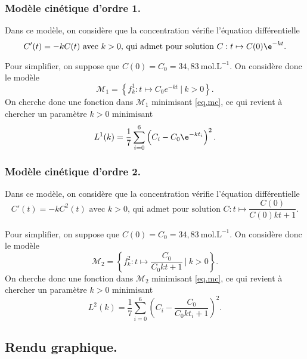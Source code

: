 \subsubsection*{Modèle cinétique d'ordre 1.}

Dans ce modèle, on considère que la concentration vérifie l'équation différentielle 
\begin{equation*}
   C'(t) = -k C(t) \textrm{ avec }k>0 \textrm{, qui admet pour solution } C:t\mapsto C(0) \e^{-kt}.
\end{equation*}

Pour simplifier, on suppose que $C(0) = C_0 = 34,83~\textrm{mol}.\textrm{L}^{-1}$. On considère donc le modèle
\begin{equation*}
  \mathscr{M}_1 = \left\{ f^1_k :t\mapsto C_0 e^{-kt} ~\big|~ k>0 \right\}.   
\end{equation*}
On cherche donc une fonction dans $\mathscr{M}_1$ minimisant \eqref{eq.mc}, ce qui revient à chercher un paramètre $k>0$ minimisant 
\begin{equation*}
  L^1(k) = \dfrac{1}{7} \sum_{i=0}^6 \left(C_i - C_0 \e^{-k t_i}\right)^2.
\end{equation*}

\subsubsection*{Modèle cinétique d'ordre 2.}

Dans ce modèle, on considère que la concentration vérifie l'équation différentielle 
\begin{equation*}
   C'(t) = -k C^2(t) \textrm{ avec }k>0 \textrm{, qui admet pour solution } C:t\mapsto \dfrac{C(0)}{C(0)kt + 1}.
\end{equation*}

Pour simplifier, on suppose que $C(0) = C_0 = 34,83~\textrm{mol}.\textrm{L}^{-1}$. On considère donc le modèle
\begin{equation*}
  \mathscr{M}_2 = \left\{ f^2_k :t\mapsto  \dfrac{C_0}{C_0kt + 1} ~\big|~ k>0 \right\}.   
\end{equation*}
On cherche donc une fonction dans $\mathscr{M}_2$ minimisant \eqref{eq.mc}, ce qui revient à chercher un paramètre $k>0$ minimisant 
\begin{equation*}
  L^2(k) = \dfrac{1}{7} \sum_{i=0}^6 \left(C_i -\dfrac{C_0}{C_0kt_i + 1}\right)^2.
\end{equation*}

\subsection*{Rendu graphique.}


